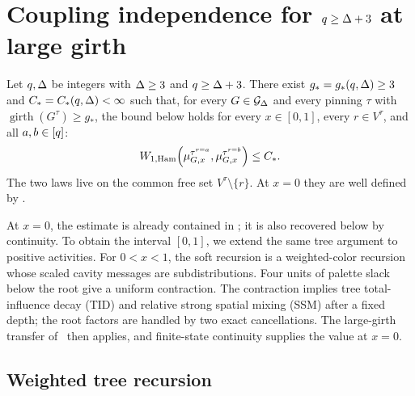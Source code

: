 \section{\texorpdfstring{Coupling independence for \(q\ge\Deg+3\) at large girth}
{Coupling independence for q >= Delta + 3 at large girth}}
\label{sec:high-girth-soft}

\begin{theorem}
\label{thm:high-girth-soft-ci}
Let $q,\Deg$ be integers with $\Deg\ge3$ and $q\ge\Deg+3$.  There exist
$g_*=g_*(q,\Deg)\ge3$ and $C_*=C_*(q,\Deg)<\infty$ such that, for every
$G\in\Gdeg$ and every pinning $\tau$ with
\(\operatorname{girth}(G^\tau)\ge g_*\), the bound
below holds for every $x\in[0,1]$, every $r\in V^\tau$, and all
$a,b\in\colours$:
\[
  \WHam\!\left(
    \mupin{G}{\tau^{r=a}}{x},
    \mupin{G}{\tau^{r=b}}{x}
  \right)\le C_*.
\]
The two laws live on the common free set $V^\tau\setminus\{r\}$.  At $x=0$
they are well defined by .
\end{theorem}

At $x=0$, the estimate is already contained in
\cite[Theorem~5.10 and Lemma~5.13]{CLMM2023}; it is also recovered below by
continuity.  To obtain the interval $[0,1]$, we extend the same tree argument
to positive activities.  For $0<x<1$, the soft recursion is a weighted-color
recursion whose scaled cavity messages are subdistributions.  Four units of
palette slack below the root give a uniform contraction.  The contraction
implies tree total-influence decay (TID) and relative strong spatial mixing
(SSM) after a fixed depth; the root factors are handled by two exact
cancellations.
The large-girth transfer of~\cite{CLMM2023} then applies, and finite-state
continuity supplies the value at $x=0$.

\subsection{Weighted tree recursion}
\label{sec:hg-weighted-recursion}

